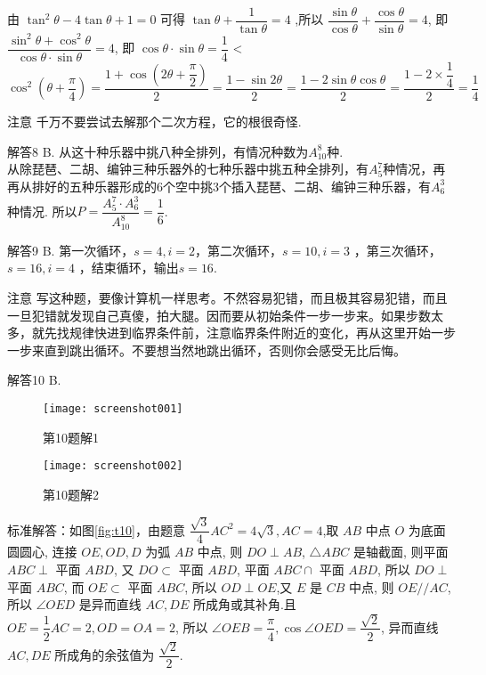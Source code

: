 \documentclass[11pt]{article}
\begin{document}
\begin{compactdesc}
		由 $\tan ^{2} \theta-4 \tan \theta+1=0$ 可得 $\tan \theta+\dfrac{1}{\tan \theta}=4$
		,所以 $\dfrac{\sin \theta}{\cos \theta}+\dfrac{\cos \theta}{\sin \theta}=4$, 即 $\dfrac{\sin ^{2} \theta+\cos ^{2} \theta}{\cos \theta \cdot \sin \theta}=4$, 即 $\cos \theta \cdot \sin \theta=\dfrac{1}{4}$ <
		$
		\cos ^{2}\left(\theta+\dfrac{\pi}{4}\right)=\dfrac{1+\cos \left(2 \theta+\dfrac{\pi}{2}\right)}{2}=\dfrac{1-\sin 2 \theta}{2}=\dfrac{1-2 \sin \theta \cos \theta}{2}=\dfrac{1-2 \times \dfrac{1}{4}}{2}=\dfrac{1}{4}
		$
		\begin{compactdesc}
			\item[\heiti 注意]千万不要尝试去解那个二次方程，它的根很奇怪.
		\end{compactdesc}
	\item[解答8]
		B. 从这十种乐器中挑八种全排列，有情况种数为$A_{10}^{8} $种.\\从除琵琶、二胡、编钟三种乐器外的七种乐器中挑五种全排列，有$A_{5}^{7}$种情况，再再从排好的五种乐器形成的6个空中挑3个插入琵琶、二胡、编钟三种乐器，有$A_{6}^{3}$种情况. 所以$P=\dfrac{A_{5}^{7}\cdot A_{6}^{3}}{A_{10}^{8}} =\dfrac{1}{6} $.
	\item[解答9]B. 第一次循环，$s=4,i=2$，第二次循环，$s=10,i=3$ ，第三次循环，$s=16,i=4$ ，结束循环，输出$s=16$.
		\begin{compactdesc}
			\item[\heiti 注意]写这种题，要像计算机一样思考。不然容易犯错，而且极其容易犯错，而且一旦犯错就发现自己真傻，拍大腿。因而要从初始条件一步一步来。如果步数太多，就先找规律快进到临界条件前，注意临界条件附近的变化，再从这里开始一步一步来直到跳出循环。不要想当然地跳出循环，否则你会感受无比后悔。
		\end{compactdesc}
	\item[解答10]
		 B.
		
		\begin{figure}[htbp]
			\centering
		\begin{minipage}{200pt}
			\centering
			\texttt{[image: screenshot001]}
			\caption{\heiti 第10题解1}
			\label{fig:t10}
		\end{minipage}
		\hspace{0pt}%
		\begin{minipage}{200pt}
			\centering
			\texttt{[image: screenshot002]}
			\caption{\heiti 第10题解2}
			\label{fig:t10_2}
		\end{minipage}
		\end{figure}	

	
		\heiti 标准解答：\songti 如图\ref{fig:t10}，由题意 $\dfrac{\sqrt{3}}{4} A C^{2}=4 \sqrt{3}, A C=4$,取 $A B$ 中点 $O$ 为底面圆圆心, 连接 $O E, O D, D$ 为弧 $A B$ 中点, 则 $D O \perp A B$,	$\triangle A B C$ 是轴截面, 则平面 $A B C \perp$ 平面 $A B D$, 又 $D O \subset$ 平面 $A B D$, 平面 $A B C \cap$ 平面 $A B D$, 所以 $D O \perp$ 平面 $A B C$, 而 $O E \subset$ 平面 $A B C$, 所以 $O D \perp O E$,又 $E$ 是 $C B$ 中点, 则 $O E / / A C$,	所以 $\angle O E D$ 是异而直线 $A C, D E$ 所成角或其补角.且 $O E=\dfrac{1}{2} A C=2, O D=O A=2$, 所以 $\angle O E B=\dfrac{\pi}{4}, \cos \angle OED=\dfrac{\sqrt{2}}{2}$,	异而直线 $A C, D E$ 所成角的余弦值为 $\dfrac{\sqrt{2}}{2}$.
		

\end{compactdesc}
\end{document}
